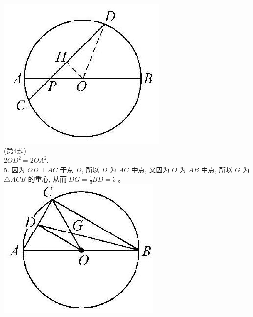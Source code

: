 \documentclass[10pt]{article}
\begin{document}
\includegraphics[max width=\textwidth, center]{2024_10_30_66b8e5e701da2093c133g-087}\\
(第4题)\\
$2 O D^{2}=2 O A^{2}$.\\
5. 因为 $O D \perp A C$ 于点 $D$, 所以 $D$ 为 $A C$ 中点, 又因为 $O$ 为 $A B$ 中点, 所以 $G$ 为 $\triangle A C B$ 的重心, 从而 $D G=\frac{1}{3} B D=3$ 。\\
\includegraphics[max width=\textwidth, center]{2024_10_30_66b8e5e701da2093c133g-088}\\
\end{document}

